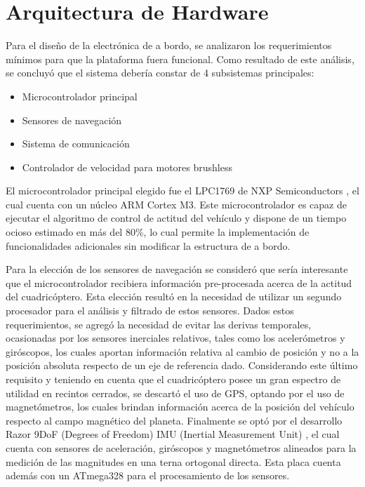 \documentclass[a4paper, conference]{IEEEtran}
\begin{document}
\vspace{5 mm}

\section{Arquitectura de Hardware}

Para el diseño de la electrónica de a bordo, se analizaron los requerimientos mínimos para que la plataforma fuera funcional. Como resultado de este análisis, se concluyó que el sistema debería constar de 4 subsistemas principales: 
\begin{itemize}
\item Microcontrolador principal
\item Sensores de navegación 
\item Sistema de comunicación
\item Controlador de velocidad para motores brushless
\end{itemize}
	
El microcontrolador principal elegido fue el LPC1769 de NXP Semiconductors \cite{lpc1769}, el cual cuenta con un núcleo ARM Cortex M3.  Este microcontrolador es capaz de ejecutar el algoritmo de control de actitud del vehículo y dispone de un tiempo ocioso estimado en más del 80\%, lo cual permite la implementación de funcionalidades adicionales sin modificar la estructura de a bordo.

Para la elección de los sensores de navegación se consideró que sería interesante que el microcontrolador recibiera información pre-procesada acerca de la actitud del cuadricóptero. Esta elección resultó en la necesidad de utilizar un segundo procesador para el análisis y filtrado de estos sensores. Dados estos requerimientos, se agregó la necesidad de evitar las derivas temporales, ocasionadas por los sensores inerciales relativos, tales como los acelerómetros y giróscopos, los cuales aportan información relativa al cambio de posición y no a la posición absoluta respecto de un eje de referencia dado. Considerando este último requisito y teniendo en cuenta que el cuadricóptero posee un gran espectro de utilidad en recintos cerrados, se descartó el uso de GPS, optando por el uso de magnetómetros, los cuales brindan información acerca de la posición del vehículo respecto al campo magnético del planeta. Finalmente se optó por el desarrollo Razor 9DoF (Degrees of Freedom) IMU (Inertial Measurement Unit) \cite{razor9d0f}, el cual cuenta con sensores de aceleración, giróscopos y magnetómetros alineados para la medición de las magnitudes en una terna ortogonal directa. Esta placa cuenta además con un ATmega328 para el procesamiento de los sensores.
\end{document}
